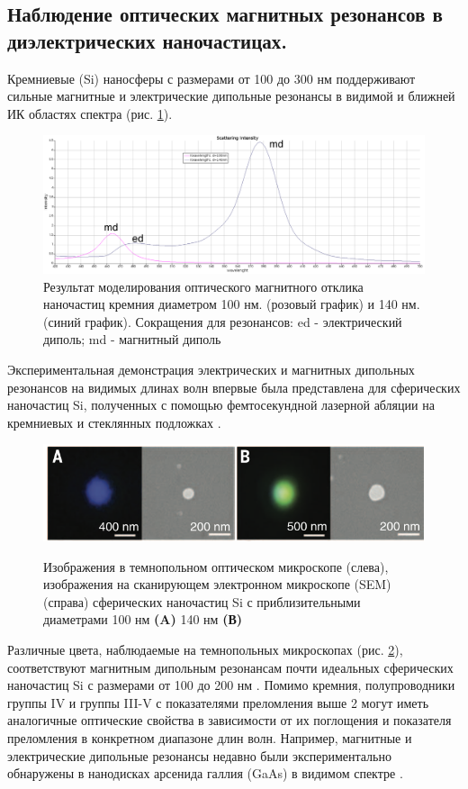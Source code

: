 \subsection*{Наблюдение оптических магнитных резонансов в диэлектрических наночастицах.}


Кремниевые (Si) наносферы с размерами от 100 до 300 нм поддерживают сильные магнитные и электрические дипольные резонансы в видимой и ближней ИК областях спектра (рис. \ref{fig2}). 
 \begin{figure}[h]
	\centering
	\includegraphics[width=0.7\linewidth]{images/graph1.png}
	\caption{Результат моделирования оптического магнитного отклика наночастиц кремния  диаметром 100 нм. (розовый график) и 140 нм. (синий график).  Сокращения для резонансов: ed - электрический диполь; md - магнитный диполь}
	\label{fig2}
\end{figure}
Экспериментальная демонстрация электрических и магнитных дипольных резонансов на видимых длинах волн впервые была представлена для сферических наночастиц Si, полученных с помощью фемтосекундной лазерной абляции на кремниевых и стеклянных подложках \cite{kuznetsov2012luk}. 
 \begin{figure}[h]
	\centering
	\includegraphics[width=0.7\linewidth]{images/fig2.png}
	\caption{ Изображения в темнопольном оптическом микроскопе (слева), изображения на сканирующем электронном микроскопе (SEM) (справа)  сферических наночастиц Si с приблизительными диаметрами 100 нм \textbf{(A)} 140 нм \textbf{(В)}} \cite{kuznetsov2012luk}
    \label{fig3}
\end{figure}
\hspace*{2mm}
Различные цвета, наблюдаемые на темнопольных микроскопах (рис. \ref{fig3}), соответствуют магнитным дипольным резонансам почти идеальных сферических наночастиц Si с размерами от 100 до 200 нм \cite{kuznetsov2012luk}.  Помимо кремния, полупроводники группы IV и группы III-V с показателями преломления выше 2 могут иметь аналогичные оптические свойства в зависимости от их поглощения и показателя преломления в конкретном диапазоне длин волн. Например, магнитные и электрические дипольные резонансы недавно были экспериментально обнаружены в нанодисках арсенида галлия (GaAs) в видимом спектре \cite{person2013demonstration}.


